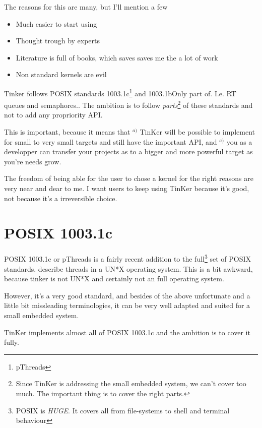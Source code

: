 The reasons for this are many, but I'll mention a few
\begin{itemize}
	\item Much easier to start using
	\item Thought trough by experts 
	\item Literature is full of books, which saves saves me the a lot of work
	\item Non standard kernels are evil	
\end{itemize}
Tinker follows POSIX standards 1003.1c\footnote{pThreads} and 1003.1b{Only part of. I.e. RT queues and semaphores.}. The ambition is to follow \textit{parts}\footnote{Since TinKer is addressing the small embedded system, we can't cover too much. The important thing is to cover the right parts.} of these standards and not to add any propriority API.

This is important, because it means that $^{a)}$ TinKer will be possible to implement for small to very small targets and still have the important API, and $^{a)}$ you as a developper can transfer your projects as to a bigger and more powerful target as you're needs grow.

The freedom of being able for the user to chose a kernel for the right reasons are very near and dear to me. I want users to keep using TinKer because it's good, not because it's a irreversible choice.

\section{POSIX 1003.1c}
POSIX 1003.1c or pThreads is a fairly recent addition to the full\footnote{POSIX is \textit{HUGE}. It covers all from file-systems to shell and terminal behaviour} set of POSIX standards. describe threads in a UN*X operating system. This is a bit awkward, because tinker is not UN*X and certainly not an full operating system.

However, it's a very good standard, and besides of the above unfortunate and a little bit missleading terminologies, it can be very well adapted and suited for a small embedded system.

TinKer implements almost all of POSIX 1003.1c and the ambition is to cover it fully.


